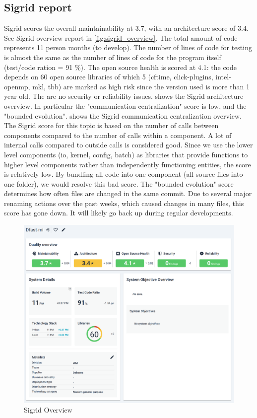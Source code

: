 \subsection{Sigrid report}
Sigrid scores the overall maintainability at 3.7, with an architecture score of 3.4.
See Sigrid overview report in \autoref{fig:sigrid_overview}.
The total amount of code represents 11 person months (to develop).
The number of lines of code for testing is almost the same as the number of lines of code for the program itself (test/code ration = 91 \%).
The open source health is scored at 4.1: the code depends on 60 open source libraries of which 5 (cftime, click-plugins, intel-openmp, mkl, tbb) are marked as high risk since the version used is more than 1 year old.
The are no security or reliability issues.
 shows the Sigrid architecture overview.
In particular the "communication centralization" score is low, and the "bounded evolution".
 shows the Sigrid communication centralization overview.
The Sigrid score for this topic is based on the number of calls between components compared to the number of calls within a component.
A lot of internal calls compared to outside calls is considered good.
Since we use the lower level components (io, kernel, config, batch) as libraries that provide functions to higher level components rather than independently functioning entities, the score is relatively low.
By bundling all code into one component (all source files into one folder), we would resolve this bad score.
The "bounded evolution" score determines how often files are changed in the same commit.
Due to several major renaming actions over the past weeks, which caused changes in many files, this score has gone down.
It will likely go back up during regular developments.

\begin{figure}
\center
\includegraphics[width=\textwidth]{figures/sigrid.png}
\caption{Sigrid Overview}
\label{fig:sigrid_overview}
\end{figure}

